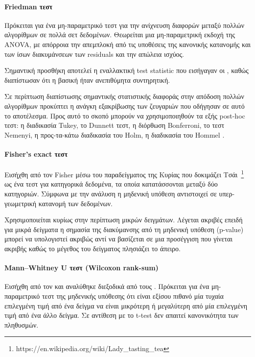 \paragraph{Friedman τεστ}
Πρόκειται για ένα μη-παραμετρικό τεστ για την ανίχνευση διαφορών μεταξύ πολλών αλγορίθμων σε πολλά σετ δεδομένων. Θεωρείται μια μη-παραμετρική εκδοχή της ANOVA, με απόρροια την απεμπλοκή από τις υποθέσεις της κανονικής κατανομής και των ίσων διακυμάνσεων των residuals και την απώλεια ισχύος.  

Σημαντική προσθήκη αποτελεί η εναλλακτική test statistic που εισήγαγαν οι \citet{doi:10.1080/03610928008827904}, καθώς διαπίστωσαν ότι η βασική ήταν ανεπιθύμητα συντηρητική. 

Σε περίπτωση διαπίστωσης σημαντικής στατιστικής διαφοράς στην απόδοση πολλών αλγορίθμων προκύπτει η ανάγκη εξακρίβωσης των ζευγαριών που οδήγησαν σε αυτό το αποτέλεσμα. Προς αυτό το σκοπό μπορούν να χρησιμοποιηθούν τα εξής post-hoc τεστ: η διαδικασία Tukey, το Dunnett τεστ, η διόρθωση Bonferroni, το τεστ Nemenyi, η προς-τα-κάτω διαδικασία του Holm, η διαδικασία του Hommel \citep{CIS-57999, citeulike:4294367, doi:10.1093/biomet/75.2.383}.
\paragraph{Fisher's exact τεστ}
 Εισήχθη από τον Fisher μέσω του παραδείγματος της Κυρίας που δοκιμάζει Τσάι~\footnote{https://en.wikipedia.org/wiki/Lady\_tasting\_tea} ως ένα τεστ για κατηγορικά δεδομένα, τα οποία κατατάσσονται μεταξύ δύο κατηγοριών. Σύμφωνα με την ανάλυση η μηδενική υπόθεση αντιστοιχεί σε υπερ-γεωμετρική κατανομή των δεδομένων.
  
 Χρησιμοποιείται κυρίως στην περίπτωση μικρών δειγμάτων. Λέγεται ακριβές επειδή για μικρά δείγματα η σημασία της διακύμανσης από τη μηδενική υπόθεση (p-value) μπορεί να υπολογιστεί ακριβώς αντί να βασίζεται σε μια προσέγγιση που γίνεται ακριβής καθώς το μέγεθος του δείγματος πλησιάζει το άπειρο.
\paragraph{Mann–Whitney U τεστ (Wilcoxon rank-sum)} Εισήχθη από τον \citet{Wilcoxon45} και αναλύθηκε διεξοδικά από τους \citet{mann1947}. Πρόκειται για ένα μη-παραμετρικό τεστ της μηδενικής υπόθεσης ότι είναι εξίσου πιθανό μία τυχαία επιλεγμένη τιμή από ένα δείγμα να είναι μικρότερη ή μεγαλύτερη από μία επιλεγμένη τιμή από ένα άλλο δείγμα. Σε αντίθεση με το t-test δεν απαιτεί κανονικότητα των πληθυσμών.
 
